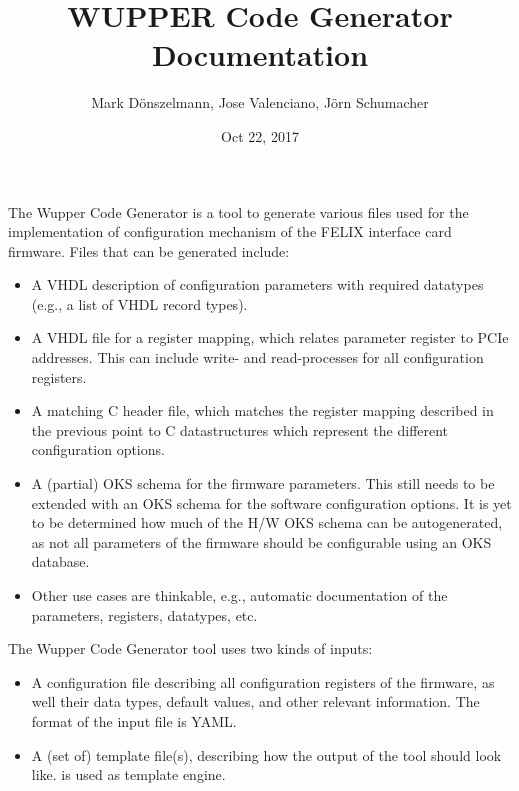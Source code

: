 \documentclass[letterpaper,10pt,english]{sphinxmanual}
\title{WUPPER Code Generator Documentation}
\date{Oct 22, 2017}
\author{Mark D\"onszelmann, Jose Valenciano, J\"orn Schumacher}
\begin{document}
\maketitle
\sphinxtableofcontents
{}\label{\detokenize{index::doc}}


The Wupper Code Generator is a tool to generate various files used for the
implementation of configuration mechanism of the FELIX interface card
firmware. Files that can be generated include:
\begin{itemize}
\item {} 
A VHDL description of configuration parameters with
required datatypes (e.g., a list of VHDL record types).

\item {} 
A VHDL file for a register mapping, which relates parameter
register to PCIe addresses. This can include write- and read-processes
for all configuration registers.

\item {} 
A matching C header file, which matches the register mapping described
in the previous point to C datastructures which represent the different
configuration options.

\item {} 
A (partial) OKS schema for the firmware parameters. This still needs to
be extended with an OKS schema for the software configuration options. It
is yet to be determined how much of the H/W OKS schema can be autogenerated,
as not all parameters of the firmware should be configurable using an OKS database.

\item {} 
Other use cases are thinkable, e.g., automatic documentation of the parameters,
registers, datatypes, etc.

\end{itemize}

The Wupper Code Generator tool uses two kinds of inputs:
\begin{itemize}
\item {} 
A configuration file describing all configuration registers of the firmware, as well
their data types, default values, and other relevant information.
The format of the input file is YAML.

\item {} 
A (set of) template file(s), describing how the output of the tool should
look like.  is used as template engine.

\end{itemize}
\end{document}
